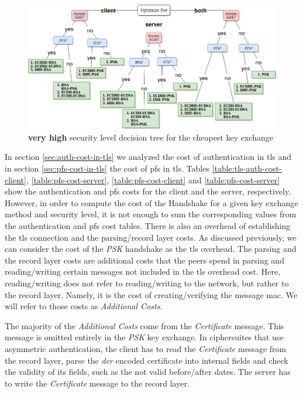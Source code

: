 \documentclass{llncs}
\begin{document}
\begin{figure}
  \centering
  \includegraphics[width=1.0\textwidth]{img/dt_veryhigh_sl.png}
  \centering \caption{\label{fig:dt-veryhigh-sl} \textbf{very high} security level decision tree for the cheapest key exchange}
\end{figure}

In section \ref{sec:auth-cost-in-tls} we analyzed the cost of authentication in \gls{tls} and in section \ref{sec:pfs-cost-in-tls}
the cost of \gls{pfs} in \gls{tls}. Tables \ref{table:tls-auth-cost-client}, \ref{table:pfs-cost-server},
\ref{table:pfs-cost-client} and \ref{table:pfs-cost-server} show the authentication and \gls{pfs} costs for the client and the server,
respectively. However, in order to compute the cost of the Handshake for a given key exchange method and security level, it
is not enough to sum the corresponding values from the authentication and \gls{pfs} cost tables. There is also an overhead of 
establishing the \gls{tls} connection and the parsing/record layer costs. As discussed previously, we can consider the cost of 
the \textit{PSK} handshake as the \gls{tls} overhead.
The parsing and the record layer costs are additional costs that the
peers spend in parsing and reading/writing certain messages not included in the \gls{tls} overhead cost.
Here, reading/writing does not refer to reading/writing to the network, but rather to the record layer. Namely, it is the cost of creating/verifying
the message \gls{mac}. We will refer to those costs as \textit{Additional Costs}.

The majority of the \textit{Additional Costs} come from the \textit{Certificate} message.
This message is omitted entirely in the \textit{PSK} key exchange. In ciphersuites that use asymmetric authentication,
the client has to read the  \textit{Certificate} message from the record layer, parse the \textit{der} encoded certificate into internal fields and
check the validity of its fields, such as the not valid before/after dates. The server has to write the \textit{Certificate} message to the
record layer.
\end{document}
